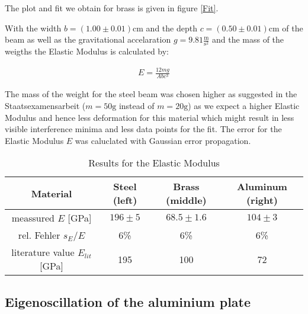 The plot and fit we obtain for brass is given in figure \ref{Fit}.


With the width  $b=(1.00\pm0.01)\mathrm{cm}$ and the depth  $c=(0.50\pm0.01)\mathrm{cm}$ of the beam as well as the gravitational accelaration $g=9.81\frac{\mathrm{m}}{\mathrm{s}^2}$ and the mass of the weigths the Elastic Modulus is calculated by: 

\begin{align}
E=\frac{12mg}{Abc^3}
\end{align}

The mass of the weight for the steel beam was chosen higher as suggested in the Staatsexamensarbeit \cite{staat} ($m=50\mathrm{g}$ instead of $m=20\mathrm{g}$) as we expect a higher Elastic Modulus and hence less deformation for this material  which might result in less visible interference minima and less data points for the fit.
The error for the Elastic Modulus $E$ was caluclated with Gaussian error propagation.

\begin{table}[h!]
	\centering
	\begin{tabular}{c|c|c|c}
		Material							& Steel (left)	& Brass (middle)	& Aluminum (right)\\ \hline\hline
		meassured $E$ [GPa]			& $196\pm5$	& $68.5\pm1.6$			& $104\pm3$			\\ \hline
		rel. Fehler $s_E/E$				& $6$\%			& $6$\%				& $6$\%				\\ \hline
	literature value \cite{staat} $E_{lit}$ [GPa]	& 195			& 100				& 72
	\end{tabular}
	\caption{Results for the Elastic Modulus}
\end{table}

\subsection{Eigenoscillation of the aluminium plate}

